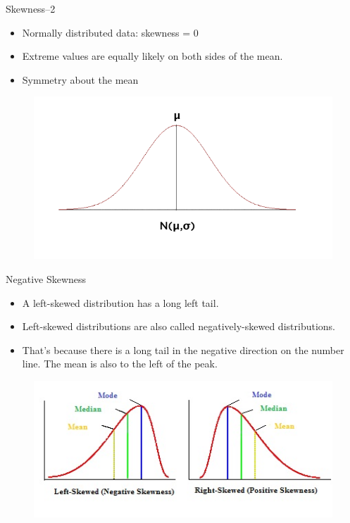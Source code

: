 \begin{frame}[t]{Skewness--2}
	\begin{itemize}
		\item Normally distributed data: skewness = 0
		\item Extreme values are equally likely on both
		sides of the mean.
		\item Symmetry about the mean
	\end{itemize}
\begin{figure} [ht]
	\centering
	\includegraphics[trim={0 1cm 0 0}, clip, scale=0.4]{eda/nd3.png}
\end{figure}
\end{frame}
\begin{frame}[t]{Negative Skewness}
	\begin{itemize}
		\item A left-skewed distribution has a long left tail.
		\item Left-skewed distributions are also called negatively-skewed 
		distributions.
		\item That’s because there is a long tail in the negative direction on 
		the number line. The mean is also to the left of the peak.
	\end{itemize}

\begin{figure} [ht]
	\centering
	\includegraphics[trim={0 0 6cm 0}, clip, 
	scale=0.7]{eda/pearson-mode-skewness.jpg}
\end{figure}
\end{frame}

